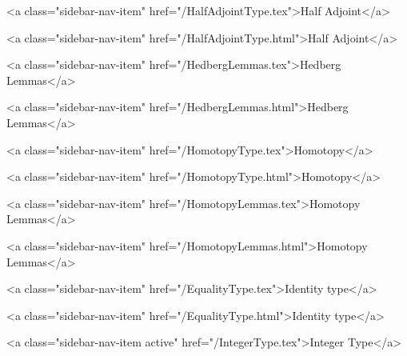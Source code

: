           <a class="sidebar-nav-item" href="/HalfAdjointType.tex">Half Adjoint</a>
        
      
    
      
        
          <a class="sidebar-nav-item" href="/HalfAdjointType.html">Half Adjoint</a>
        
      
    
      
        
          <a class="sidebar-nav-item" href="/HedbergLemmas.tex">Hedberg Lemmas</a>
        
      
    
      
        
          <a class="sidebar-nav-item" href="/HedbergLemmas.html">Hedberg Lemmas</a>
        
      
    
      
        
          <a class="sidebar-nav-item" href="/HomotopyType.tex">Homotopy</a>
        
      
    
      
        
          <a class="sidebar-nav-item" href="/HomotopyType.html">Homotopy</a>
        
      
    
      
        
          <a class="sidebar-nav-item" href="/HomotopyLemmas.tex">Homotopy Lemmas</a>
        
      
    
      
        
          <a class="sidebar-nav-item" href="/HomotopyLemmas.html">Homotopy Lemmas</a>
        
      
    
      
        
          <a class="sidebar-nav-item" href="/EqualityType.tex">Identity type</a>
        
      
    
      
        
          <a class="sidebar-nav-item" href="/EqualityType.html">Identity type</a>
        
      
    
      
        
          <a class="sidebar-nav-item active" href="/IntegerType.tex">Integer Type</a>
        
      
    
      
        
